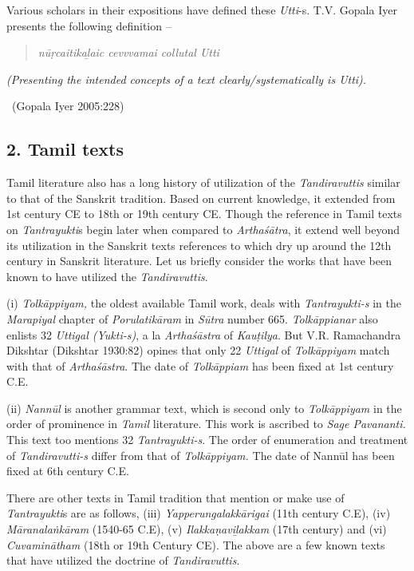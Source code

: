 Various scholars in their expositions have defined these \textit{Utti}-s. T.V. Gopala Iyer presents the following definition –

\begin{verse}
\textit{nūṛcaitikaḻaic cevvvamai collutal Utti}
\end{verse}

\begin{myquote}
\textit{(Presenting the intended concepts of a text clearly/systematically is Utti).}

~\hfill (Gopala Iyer 2005:228)
\end{myquote}


\subsection*{2. Tamil texts}

Tamil literature also has a long history of utilization of the \textit{Tandiravuttis} similar to that of the Sanskrit tradition. Based on current knowledge, it extended from 1st century CE to 18th or 19th century CE. Though the reference in Tamil texts on \textit{Tantrayukti}s begin later when compared to \textit{Arthaśātra}, it extend well beyond its utilization in the Sanskrit texts references to which dry up around the 12th century in Sanskrit literature. Let us briefly consider the works that have been known to have utilized the \textit{Tandiravuttis}.

(i) \textit{Tolkāppiyam,} the oldest available Tamil work, deals with \textit{Tantrayukti-s} in the \textit{Marapiyal} chapter of \textit{Porulatikāram} in \textit{Sūtra} number 665. \textit{Tolkāppianar} also enlists 32 \textit{Uttigal (Yukti-s)}, a la \textit{Arthaśāstra} of \textit{Kauṭilya}. But V.R. Ramachandra Dikshtar (Dikshtar 1930:82) opines that only 22 \textit{Uttigal} of \textit{Tolkāppiyam} match with that of \textit{Arthaśāstra}. The date of \textit{Tolkāppiam} has been fixed at 1st century C.E.

(ii) \textit{Nannūl} is another grammar text, which is second only to \textit{Tolkāppiyam} in the order of prominence in \textit{Tamil} literature. This work is ascribed to \textit{Sage Pavananti.} This text too mentions 32 \textit{Tantrayukti-s}. The order of enumeration and treatment of \textit{Tandiravutti-s } differ from that of \textit{Tolkāppiyam.} The date of Nannūl has been fixed at 6th century C.E.

There are other texts in Tamil tradition that mention or make use of \textit{Tantrayukti}s are as follows, (iii) \textit{Yapperungalakkārigai} (11th century C.E), (iv) \textit{Māranalaṅkāram} (1540-65 C.E), (v) \textit{Ilakkaṇaviḻakkam} (17th century) and (vi) \textit{Cuvaminātham} (18th or 19th Century CE). The above are a few known texts that have utilized the doctrine of \textit{Tandiravuttis}.



